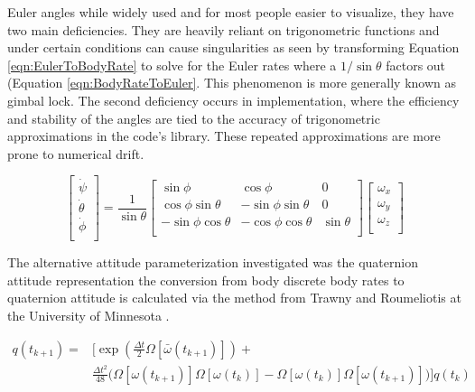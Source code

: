 Euler angles while widely used and for most people easier to visualize, they have two main deficiencies.  They are heavily reliant on trigonometric functions and under certain conditions can cause singularities as seen by transforming Equation \ref{eqn:EulerToBodyRate} to solve for the Euler rates where a $1/\sin \theta$ factors out (Equation \ref{eqn:BodyRateToEuler}.  This phenomenon is more generally known as gimbal lock.  The second deficiency occurs in implementation, where the efficiency and stability of the angles are tied to the accuracy of trigonometric approximations in the code's library.  These repeated approximations are more prone to numerical drift.

\begin{equation}
  \begin{bmatrix}
    \dot{\psi} \\
    \dot{\theta} \\
    \dot{\phi} \\
  \end{bmatrix}
  =
  \frac{1}{\sin \theta}
  \begin{bmatrix}
    \sin \phi & \cos \phi & 0 \\
    \cos \phi \sin \theta & -\sin \phi \sin \theta & 0 \\
    -\sin \phi \cos \theta & -\cos \phi \cos \theta & \sin \theta \\
  \end{bmatrix}
  \begin{bmatrix}
    \omega_x \\
    \omega_y \\
    \omega_z \\
  \end{bmatrix}
  \label{eqn:BodyRateToEuler}
\end{equation}

The alternative attitude parameterization investigated was the quaternion attitude representation the conversion from body discrete body rates to quaternion attitude is calculated via the method from Trawny and Roumeliotis at the University of Minnesota \cite{marslab}.

\begin{equation}
  \begin{aligned}
    q(t_{k+1}) = & \bigg[ \exp \left( \frac{\Delta t}{2} \Omega \left[ \bar{\omega}(t_{k+1}) \right] \right) + \\
    & \frac{\Delta t^2}{48} \Big(
    \Omega \left[\omega(t_{k+1}) \right]
    \Omega \left[\omega(t_{k})   \right] -
    \Omega \left[\omega(t_{k})   \right]
    \Omega \left[\omega(t_{k+1}) \right]
      \Big) \bigg] q(t_{k})
  \end{aligned}
\end{equation}

